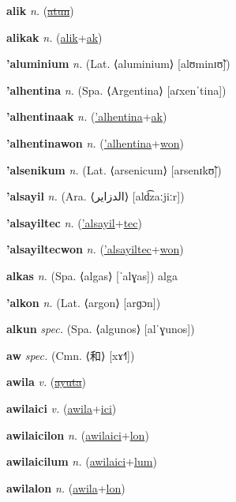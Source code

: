 \textbf{\hypertarget{alik}{alik}} \textit{n.} (\hyperlink{atun}{\sout{atun}})


\textbf{\hypertarget{alikak}{alikak}} \textit{n.} (\hyperlink{alik}{alik}+\allowbreak \hyperlink{ak}{ak})


\textbf{\hypertarget{'aluminium}{'aluminium}} \textit{n.} (Lat. ⟨aluminium⟩ [alʊminɪʊ̃])


\textbf{\hypertarget{'alhentina}{'alhentina}} \textit{n.} (Spa. ⟨Argentina⟩ [aɾxenˈtina])


\textbf{\hypertarget{'alhentinaak}{'alhentinaak}} \textit{n.} (\hyperlink{'alhentina}{'alhentina}+\allowbreak \hyperlink{ak}{ak})


\textbf{\hypertarget{'alhentinawon}{'alhentinawon}} \textit{n.} (\hyperlink{'alhentina}{'alhentina}+\allowbreak \hyperlink{won}{won})


\textbf{\hypertarget{'alsenikum}{'alsenikum}} \textit{n.} (Lat. ⟨arsenicum⟩ [arsenɪkʊ̃])


\textbf{\hypertarget{'alsayil}{'alsayil}} \textit{n.} (Ara. ⟨{\arabics{}الدزاير}⟩ [ald͡zaːjiːr])


\textbf{\hypertarget{'alsayiltec}{'alsayiltec}} \textit{n.} (\hyperlink{'alsayil}{'alsayil}+\allowbreak \hyperlink{tec}{tec})


\textbf{\hypertarget{'alsayiltecwon}{'alsayiltecwon}} \textit{n.} (\hyperlink{'alsayiltec}{'alsayiltec}+\allowbreak \hyperlink{won}{won})


\textbf{\hypertarget{alkas}{alkas}} \textit{n.} (Spa. ⟨algas⟩ [ˈalɣas])
alga

\textbf{\hypertarget{'alkon}{'alkon}} \textit{n.} (Lat. ⟨argon⟩ [arɡɔn])


\textbf{\hypertarget{alkun}{alkun}} \textit{spec.} (Spa. ⟨algunos⟩ [alˈɣunos])


\textbf{\hypertarget{aw}{aw}} \textit{spec.} (Cmn. ⟨{\chinese{}和}⟩ [xɤ˧˥])


\textbf{\hypertarget{awila}{awila}} \textit{v.} (\hyperlink{ayuta}{\sout{ayuta}})


\textbf{\hypertarget{awilaici}{awilaici}} \textit{v.} (\hyperlink{awila}{awila}+\allowbreak \hyperlink{ici}{ici})


\textbf{\hypertarget{awilaicilon}{awilaicilon}} \textit{n.} (\hyperlink{awilaici}{awilaici}+\allowbreak \hyperlink{lon}{lon})


\textbf{\hypertarget{awilaicilum}{awilaicilum}} \textit{n.} (\hyperlink{awilaici}{awilaici}+\allowbreak \hyperlink{lum}{lum})


\textbf{\hypertarget{awilalon}{awilalon}} \textit{n.} (\hyperlink{awila}{awila}+\allowbreak \hyperlink{lon}{lon})


